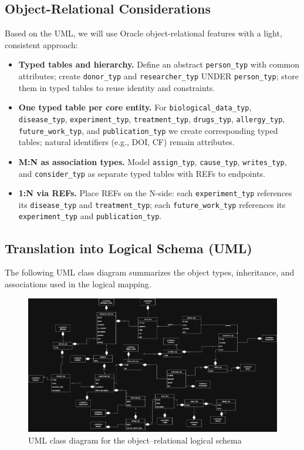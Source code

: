 \documentclass[11pt,a4paper]{article}
\begin{document}
\subsection{Object-Relational Considerations}

Based on the UML, we will use Oracle object-relational features with a light, consistent approach:

\begin{itemize}
  \item \textbf{Typed tables and hierarchy.} Define an abstract \texttt{person\_typ} with common attributes; create \texttt{donor\_typ} and \texttt{researcher\_typ} UNDER \texttt{person\_typ}; store them in typed tables to reuse identity and constraints.
  \item \textbf{One typed table per core entity.} For \texttt{biological\_data\_typ}, \texttt{disease\_typ}, \texttt{experiment\_typ}, \texttt{treatment\_typ}, \texttt{drugs\_typ}, \texttt{allergy\_typ}, \texttt{future\_work\_typ}, and \texttt{publication\_typ} we create corresponding typed tables; natural identifiers (e.g., DOI, CF) remain attributes.
  \item \textbf{M:N as association types.} Model \texttt{assign\_typ}, \texttt{cause\_typ}, \texttt{writes\_typ}, and \texttt{consider\_typ} as separate typed tables with REFs to endpoints.
  \item \textbf{1:N via REFs.} Place REFs on the N-side: each \texttt{experiment\_typ} references its \texttt{disease\_typ} and \texttt{treatment\_typ}; each \texttt{future\_work\_typ} references its \texttt{experiment\_typ} and \texttt{publication\_typ}.
\end{itemize}

\subsection{Translation into Logical Schema (UML)}

\noindent The following UML class diagram summarizes the object types, inheritance, and associations used in the logical mapping.

\begin{figure}[H]
\centering
\includegraphics[width=1.10\textwidth]{img/UML progetto.drawio.png}
\caption{UML class diagram for the object–relational logical schema}
\label{fig:uml-logical}
\end{figure}
\end{document}
